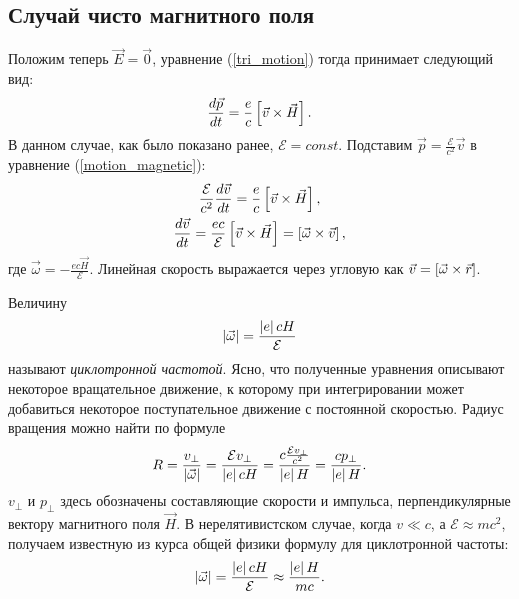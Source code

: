 \subsection{Случай чисто магнитного поля}
    Положим теперь $\vec{E} = \vec{0}$, уравнение (\ref{tri_motion}) тогда принимает следующий вид:
    \begin{equation}
        \frac{d\vec{p}}{dt} = \frac ec \left[{\vec{v}\times\vec{H}}\right]. \label{motion_magnetic}
    \end{equation}
    В данном случае, как было показано ранее, $\mathcal{E} = const$.
    Подставим $\vec{p} = \frac{\mathcal{E}}{c^2}\vec{v}$ в уравнение (\ref{motion_magnetic}):
    \begin{gather*}
        \frac{\mathcal{E}}{c^2} \frac{d\vec{v}}{dt} = \frac ec \left[{\vec{v}\times\vec{H}}\right], \\
        \frac{d\vec{v}}{dt} = \frac{ec}{\mathcal{E}}\left[{\vec{v}\times\vec{H}}\right] = \left[{\vec{\omega}\times\vec{v}}\right],
    \end{gather*}
    где $\displaystyle \vec{\omega} = -\frac{ec\vec{H}}{\mathcal{E}}$. Линейная скорость выражается через угловую как
    $\displaystyle \vec{v} = \left[{\vec{\omega}\times\vec{r}}\right]$.
    
    Величину $$ \left|{\vec{\omega}}\right| = \frac{\left|{e}\right|cH}{\mathcal{E}}$$ называют \textit{циклотронной частотой}. Ясно, что полученные уравнения
    описывают некоторое вращательное движение, к которому при интегрировании может добавиться некоторое поступательное движение с постоянной скоростью.
    Радиус вращения можно найти по формуле
    \[
        R = \frac{v_{\perp}}{\left|{\vec{\omega}}\right|} = \frac{\mathcal{E}v_{\perp}}{\left|{e}\right|cH} = \frac{c \frac{\mathcal{E}v_{\perp}}{c^2}}{\left|{e}\right|H} =
        \frac{cp_{\perp}}{\left|{e}\right|H}.
    \]
    $v_{\perp}$ и $p_{\perp}$ здесь обозначены составляющие скорости и импульса, перпендикулярные вектору магнитного поля $\vec{H}$.
    В нерелятивистском случае, когда $v \ll c$, а $\mathcal{E} \approx mc^2$, получаем известную из курса общей физики формулу для циклотронной частоты:
    \[
        \left|{\vec{\omega}}\right| = \frac{\left|{e}\right|cH}{\mathcal{E}} \approx \frac{\left|{e}\right|H}{mc}.
    \]


